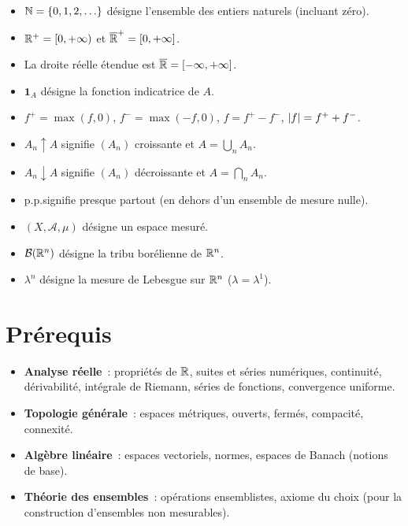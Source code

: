 \begin{itemize}
    \item $\mathbb{N} = \{0, 1, 2, \ldots\}$ d\'esigne l'ensemble des entiers naturels
    (incluant z\'ero).
    \item $\mathbb{R}^+ = [0, +\infty)$ et $\overline{\mathbb{R}}^+ = [0, +\infty]$.
    \item La droite r\'eelle \'etendue est $\overline{\mathbb{R}} = [-\infty, +\infty]$.
    \item $\mathbf{1}_A$ d\'esigne la fonction indicatrice de $A$.
    \item $f^+ = \max(f, 0)$, $f^- = \max(-f, 0)$, $f = f^+ - f^-$,
    $\left| f \right| = f^+ + f^-$.
    \item $A_n \uparrow A$ signifie $(A_n)$ croissante et $A = \bigcup_n A_n$.
    \item $A_n \downarrow A$ signifie $(A_n)$ d\'ecroissante et $A = \bigcap_n A_n$.
    \item \og p.p.\fg signifie \og presque partout \fg (en dehors d'un ensemble
    de mesure nulle).
    \item $(X, \mathcal{A}, \mu)$ d\'esigne un espace mesur\'e.
    \item $\mathcal{B}(\mathbb{R}^n)$ d\'esigne la tribu bor\'elienne de $\mathbb{R}^n$.
    \item $\lambda^n$ d\'esigne la mesure de Lebesgue sur $\mathbb{R}^n$ ($\lambda = \lambda^1$).
\end{itemize}

\section*{Pr\'erequis}

\begin{itemize}
    \item \textbf{Analyse r\'eelle}~: propri\'et\'es de $\mathbb{R}$, suites et s\'eries
    num\'eriques, continuit\'e, d\'erivabilit\'e, int\'egrale de Riemann, s\'eries de
    fonctions, convergence uniforme.
    \item \textbf{Topologie g\'en\'erale}~: espaces m\'etriques, ouverts, ferm\'es,
    compacit\'e, connexit\'e.
    \item \textbf{Alg\`ebre lin\'eaire}~: espaces vectoriels, normes, espaces de
    Banach (notions de base).
    \item \textbf{Th\'eorie des ensembles}~: op\'erations ensemblistes, axiome du
    choix (pour la construction d'ensembles non mesurables).
\end{itemize}

